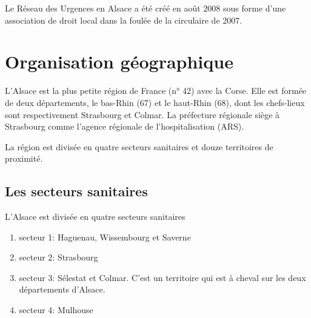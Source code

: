 \documentclass[12pt,english,french,twoside]{book}\usepackage[]{graphicx}\usepackage[]{color}
\begin{document}

Le Réseau des Urgences en Alsace a été créé en août 2008 sous forme d'une association de droit local dans la foulée de la circulaire de 2007.


\cite{16}


\newpage
\chapter{Organisation géographique}


L’Alsace est la plus petite région de France (n° 42) avec la Corse. Elle est formée de deux départements, le bas-Rhin (67) et le haut-Rhin (68), dont les chefs-lieux sont respectivement Strasbourg et Colmar. La préfecture régionale siège à Strasbourg comme l'agence régionale de l'hospitalisation  (ARS).

La région est divisée en quatre secteurs sanitaires et douze territoires de proximité.

\section{Les secteurs sanitaires}

L'Alsace est divisée en quatre secteurs sanitaires
\begin{enumerate}
  \item secteur 1: Haguenau, Wissembourg et Saverne
  \item secteur 2: Strasbourg
  \item secteur 3: Sélestat et Colmar. C'est un territoire qui est à cheval sur les deux départements d'Alsace.
  \item secteur 4: Mulhouse
\end{enumerate}
\end{document}
